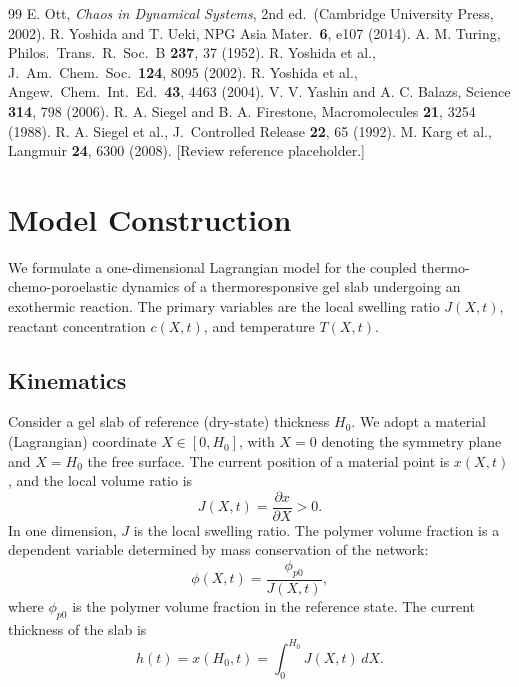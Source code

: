 \documentclass[aps,pre,reprint,superscriptaddress,longbibliography,floatfix]{revtex4-2}
\newcommand{\pp}{\phi_{p0}}
\begin{document}
\begin{thebibliography}{99}
 E. Ott, \textit{Chaos in Dynamical Systems}, 2nd ed.\ (Cambridge University Press, 2002).
 R. Yoshida and T. Ueki, NPG Asia Mater.\ \textbf{6}, e107 (2014).
 A. M. Turing, Philos.\ Trans.\ R.\ Soc.\ B \textbf{237}, 37 (1952).
 R. Yoshida et al., J.\ Am.\ Chem.\ Soc.\ \textbf{124}, 8095 (2002).
 R. Yoshida et al., Angew.\ Chem.\ Int.\ Ed.\ \textbf{43}, 4463 (2004).
 V. V. Yashin and A. C. Balazs, Science \textbf{314}, 798 (2006).
 R. A. Siegel and B. A. Firestone, Macromolecules \textbf{21}, 3254 (1988).
 R. A. Siegel et al., J.\ Controlled Release \textbf{22}, 65 (1992).
 M. Karg et al., Langmuir \textbf{24}, 6300 (2008).
 [Review reference placeholder.]
\end{thebibliography}

\appendix

\section{Model Construction}
\label{app:model}

We formulate a one-dimensional Lagrangian model for the coupled thermo-chemo-poroelastic dynamics of a thermoresponsive gel slab undergoing an exothermic reaction. The primary variables are the local swelling ratio $J(X,t)$, reactant concentration $c(X,t)$, and temperature $T(X,t)$.

\subsection{Kinematics}

Consider a gel slab of reference (dry-state) thickness $H_0$. We adopt a material (Lagrangian) coordinate $X\in[0,H_0]$, with $X=0$ denoting the symmetry plane and $X=H_0$ the free surface. The current position of a material point is $x(X,t)$, and the local volume ratio is
\begin{equation}
  J(X,t) = \frac{\partial x}{\partial X} > 0.
  \label{eq:J_def}
\end{equation}
In one dimension, $J$ is the local swelling ratio. The polymer volume fraction is a dependent variable determined by mass conservation of the network:
\begin{equation}
  \phi(X,t) = \frac{\pp}{J(X,t)},
  \label{eq:phi_J}
\end{equation}
where $\pp$ is the polymer volume fraction in the reference state. The current thickness of the slab is
\begin{equation}
  h(t) = x(H_0,t) = \int_0^{H_0} J(X,t)\,dX.
  \label{eq:thickness}
\end{equation}
\end{document}
